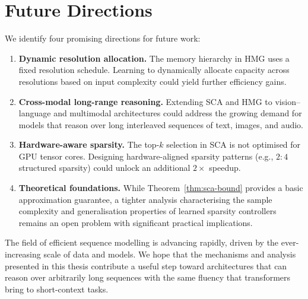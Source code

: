 \section{Future Directions}

We identify four promising directions for future work:

\begin{enumerate}[label=\textbf{\arabic*.}, leftmargin=2em]
  \item \textbf{Dynamic resolution allocation.} The memory hierarchy in HMG uses a fixed
    resolution schedule. Learning to dynamically allocate capacity across resolutions
    based on input complexity could yield further efficiency gains.
  \item \textbf{Cross-modal long-range reasoning.} Extending SCA and HMG to
    vision--language and multimodal architectures could address the growing demand for
    models that reason over long interleaved sequences of text, images, and audio.
  \item \textbf{Hardware-aware sparsity.} The top-$k$ selection in SCA is not
    optimised for GPU tensor cores. Designing hardware-aligned sparsity patterns
    (e.g., $2{:}4$ structured sparsity) could unlock an additional $2\times$ speedup.
  \item \textbf{Theoretical foundations.} While Theorem~\ref{thm:sca-bound} provides a
    basic approximation guarantee, a tighter analysis characterising the sample
    complexity and generalisation properties of learned sparsity controllers remains an
    open problem with significant practical implications.
\end{enumerate}

The field of efficient sequence modelling is advancing rapidly, driven by the
ever-increasing scale of data and models. We hope that the mechanisms and analysis
presented in this thesis contribute a useful step toward architectures that can reason
over arbitrarily long sequences with the same fluency that transformers bring to
short-context tasks.

\backmatter

